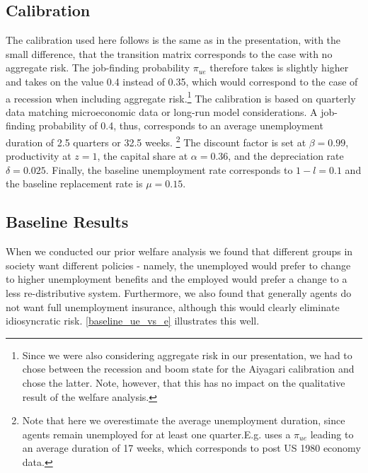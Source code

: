 \documentclass[a4paper,12pt]{article}
\begin{document}
\subsection{Calibration}

The calibration used here follows \cite{DenHaan20101} is the same as in the presentation, with the small difference, that the transition matrix corresponds to the case with no aggregate risk. The job-finding probability $\pi_{ue}$ therefore takes is slightly higher and takes on the value 0.4 instead of 0.35, which would correspond to the case of a recession when including aggregate risk.\footnote{Since we were also considering aggregate risk in our presentation, we had to chose between the recession and boom state for the Aiyagari calibration and chose the latter. Note, however, that this has no impact on the qualitative result of the welfare analysis.} The calibration is based on quarterly data matching microeconomic data or long-run model considerations. A job-finding probability of 0.4, thus, corresponds to an average unemployment duration of 2.5 quarters or 32.5 weeks. \footnote{Note that here we overestimate the average unemployment duration, since agents remain unemployed for at least one quarter.E.g. \cite{mukoyama} uses a $\pi_{ue}$ leading to an average duration of 17 weeks, which corresponds to post US 1980 economy data.} The discount factor is set at $\beta = 0.99$, productivity at $z = 1$, the capital share at $\alpha = 0.36$, and the depreciation rate $\delta = 0.025$. Finally, the baseline unemployment rate corresponds to  $1- l=0.1$ and the baseline replacement rate is $\mu = 0.15$.

\subsection{Baseline Results}

When we conducted our prior welfare analysis we found that different groups in society want different policies - namely, the unemployed would prefer to change to higher unemployment benefits and the employed would prefer a change to a less re-distributive system. Furthermore, we also found that generally agents do not want full unemployment insurance, although this would clearly eliminate idiosyncratic risk. 
\ref{baseline_ue_vs_e} illustrates this well. 
\end{document}

